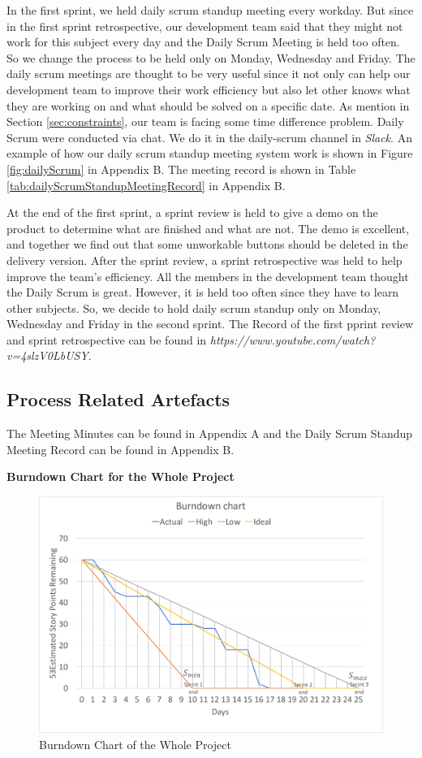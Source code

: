 \documentclass{report}
\begin{document}
In the first sprint, we held daily scrum standup meeting every workday. But since in the first sprint retrospective, our development team said that they might not work for this subject every day and the Daily Scrum Meeting is held too often. So we change the process to be held only on Monday, Wednesday and Friday. The daily scrum meetings are thought to be very useful since it not only can help our development team to improve their work efficiency but also let other knows what they are working on and what should be solved on a specific date. As mention in Section \ref{sec:constraints}, our team is facing some time difference problem. Daily Scrum were conducted via chat. We do it in the daily-scrum channel in \textit{Slack}. An example of how our daily scrum standup meeting system work is shown in Figure \ref{fig:dailyScrum} in Appendix B. The meeting record is shown in Table \ref{tab:dailyScrumStandupMeetingRecord} in Appendix B.

At the end of the first sprint, a sprint review is held to give a demo on the product to determine what are finished and what are not. The demo is excellent, and together we find out that some unworkable buttons should be deleted in the delivery version. After the sprint review, a sprint retrospective was held to help improve the team's efficiency. All the members in the development team thought the Daily Scrum is great. However, it is held too often since they have to learn other subjects. So, we decide to hold daily scrum standup only on Monday, Wednesday and Friday in the second sprint. The Record of the first pprint review and sprint retrospective can be found in \textit{https://www.youtube.com/watch?v=4slzV0LbUSY}.

\subsection{Process Related Artefacts}  
The Meeting Minutes can be found in Appendix A and the Daily Scrum Standup Meeting Record can be found in Appendix B. 

\textbf{Burndown Chart for the Whole Project}

\begin{figure}[htp]
\centering
\includegraphics[width=\textwidth]{Figures/totalBurndown.pdf}
\caption{Burndown Chart of the Whole Project}
\label{fig:totalBurndown}
\end{figure}
\end{document}
